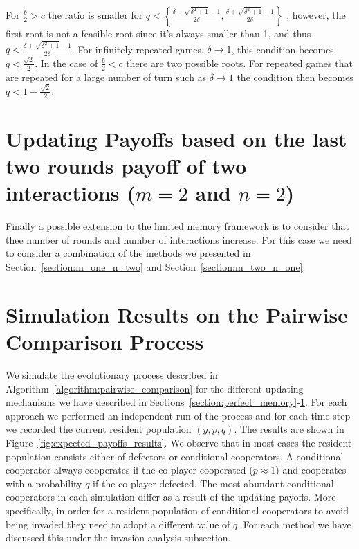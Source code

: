 \documentclass[11pt]{article}
\theoremstyle{plainCl1}
\theoremstyle{plainCl2}
\begin{document}
For \(\frac{b}{2}>c\) the ratio is smaller for
\(q < \left\{\frac{\delta - \sqrt{\delta^{2} + 1} - 1}{2 \delta}, \frac{\delta + \sqrt{\delta^{2} + 1} - 1}{2 \delta}\right\}\)
, however, the first root is not a feasible root since it's always smaller
than 1, and thus \(q < \frac{\delta + \sqrt{\delta^{2} + 1} - 1}{2 \delta}\). For
infinitely repeated games, \(\delta \rightarrow 1\), this condition becomes \(q
< \frac{\sqrt{2}}{2}\). In the case of \(\frac{b}{2}<c\) there are two possible
roots. For repeated games that are repeated for a large number of turn such as
\(\delta \rightarrow 1\) the condition then becomes \(q < 1 -
\frac{\sqrt{2}}{2}\).

\section{Updating Payoffs based on the last two rounds payoff of two interactions (\(m=2\) and \(n=2\))}\label{section:m_two_n_two}

Finally a possible extension to the limited memory framework is to consider that
thee number of rounds and number of interactions increase. For this case we need
to consider a combination of the methods we presented in
Section~\ref{section:m_one_n_two} and Section~\ref{section:m_two_n_one}.

\section{Simulation Results on the Pairwise Comparison Process}\label{section:simulation_results}

We simulate the evolutionary process described in
Algorithm~\ref{algorithm:pairwise_comparison} for the different updating
mechanisms we have described in
Sections~\ref{section:perfect_memory}-\ref{section:m_two_n_two}. For each
approach we performed an independent run of the process and for each time step we
recorded the current resident population \((y, p, q)\). The results are shown in
Figure~\ref{fig:expected_payoffs_results}. We observe that in most cases the
resident population consists either of defectors or conditional cooperators. A
conditional cooperator always cooperates if the co-player cooperated
($p\approx1$) and cooperates with a probability \(q\) if the co-player defected.
The most abundant conditional cooperators in each simulation differ as a
result of the updating payoffs. More specifically, in order for a resident
population of conditional cooperators to avoid being invaded they need to adopt
a different value of \(q\). For each method we have discussed this under the
invasion analysis subsection. 
\end{document}
